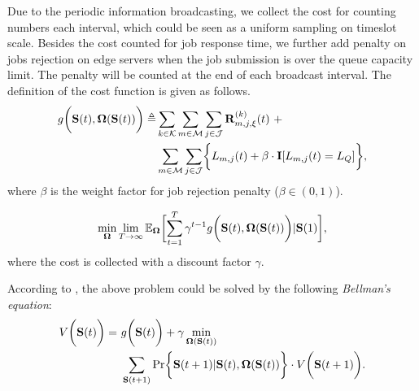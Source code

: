 Due to the periodic information broadcasting, we collect the cost for counting numbers each interval, which could be seen as a uniform sampling on timeslot scale.
Besides the cost counted for job response time, we further add penalty on jobs rejection on edge servers when the job submission is over the queue capacity limit. The penalty will be counted at the end of each broadcast interval.
The definition of the cost function is given as follows.
\begin{align}
    g\Paren{\Stat({t}), \Policy(\Stat({t}))} \define
        &\sum_{k\in\apSet} \sum_{m\in\esSet} \sum_{j\in\jSpace} \vec{R}^{(k)}_{m,j,\xi}({t})~+
        \nonumber\\
        &\sum_{m\in\esSet} \sum_{j\in\jSpace} \Brace{L_{m,j}({t}) + \beta \cdot \mat{I}[L_{m,j}({t})=L_Q]},
\end{align}
where $\beta$ is the weight factor for job rejection penalty ($\beta \in (0,1)$).

\begin{problem}
    \begin{align}
        \min_{\Policy} \lim_{T \to \infty}
            \mathbb{E}_{\Policy}
                \Bracket{\sum_{t=1}^{T} \gamma^{t-1} g\Paren{\Stat({t}), \Policy(\Stat({t}))}|\Stat(1)},
    \end{align}
    where the cost is collected with a discount factor $\gamma$.
\end{problem}
According to \cite{sutton1998introduction}, the above problem could be solved by the following \emph{Bellman's equation}:
\begin{align}
    V\Paren{\Stat({t})} =~&g\Paren{\Stat({t})} + \gamma \min_{\Policy(\Stat({t}))}
        \nonumber\\
        &\sum_{\Stat({t+1})} \Pr\Brace{ \Stat({t+1})|\Stat({t}), \Policy(\Stat({t})) } \cdot V\Paren{\Stat({t+1})}.
    \label{sp_0}
\end{align}

